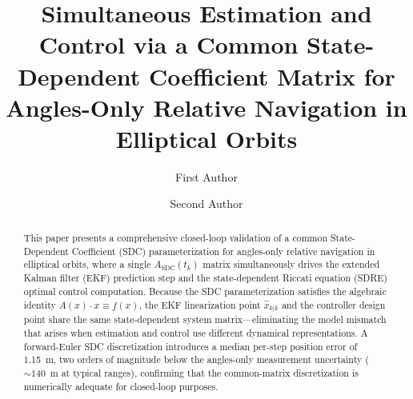 \documentclass[preprint,3p,times]{elsarticle}
\begin{document}
\begin{frontmatter}

\title{Simultaneous Estimation and Control via a Common State-Dependent Coefficient Matrix for Angles-Only Relative Navigation in Elliptical Orbits}

\author[1]{First Author}
\author[1]{Second Author}
\address[1]{Institution, City, Country}

\begin{abstract}
This paper presents a comprehensive closed-loop validation of a common State-Dependent Coefficient (SDC) parameterization for angles-only relative navigation in elliptical orbits, where a single $A_{\text{SDC}}(t_k)$ matrix simultaneously drives the extended Kalman filter (EKF) prediction step and the state-dependent Riccati equation (SDRE) optimal control computation. Because the SDC parameterization satisfies the algebraic identity $A(x) \cdot x \equiv f(x)$, the EKF linearization point $\hat{x}_{k|k}$ and the controller design point share the same state-dependent system matrix---eliminating the model mismatch that arises when estimation and control use different dynamical representations. A forward-Euler SDC discretization introduces a median per-step position error of 1.15~m, two orders of magnitude below the angles-only measurement uncertainty (${\sim}140$~m at typical ranges), confirming that the common-matrix discretization is numerically adequate for closed-loop purposes.


\end{abstract}
\end{frontmatter}
\end{document}
